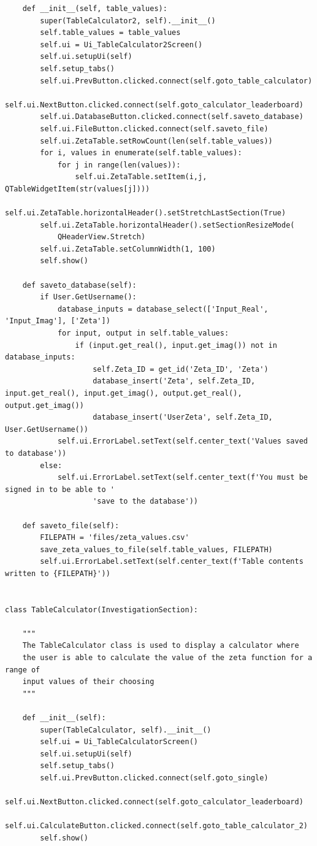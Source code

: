 \documentclass{article}
\begin{document}
\begin{lstlisting}
    def __init__(self, table_values):
        super(TableCalculator2, self).__init__()
        self.table_values = table_values
        self.ui = Ui_TableCalculator2Screen()
        self.ui.setupUi(self)
        self.setup_tabs()
        self.ui.PrevButton.clicked.connect(self.goto_table_calculator)
        self.ui.NextButton.clicked.connect(self.goto_calculator_leaderboard)
        self.ui.DatabaseButton.clicked.connect(self.saveto_database)
        self.ui.FileButton.clicked.connect(self.saveto_file)
        self.ui.ZetaTable.setRowCount(len(self.table_values))
        for i, values in enumerate(self.table_values):
            for j in range(len(values)):
                self.ui.ZetaTable.setItem(i,j, QTableWidgetItem(str(values[j])))
        self.ui.ZetaTable.horizontalHeader().setStretchLastSection(True)
        self.ui.ZetaTable.horizontalHeader().setSectionResizeMode(
            QHeaderView.Stretch)
        self.ui.ZetaTable.setColumnWidth(1, 100)
        self.show()

    def saveto_database(self):
        if User.GetUsername():
            database_inputs = database_select(['Input_Real', 'Input_Imag'], ['Zeta'])
            for input, output in self.table_values:
                if (input.get_real(), input.get_imag()) not in database_inputs:
                    self.Zeta_ID = get_id('Zeta_ID', 'Zeta')
                    database_insert('Zeta', self.Zeta_ID, input.get_real(), input.get_imag(), output.get_real(), output.get_imag())
                    database_insert('UserZeta', self.Zeta_ID, User.GetUsername())
            self.ui.ErrorLabel.setText(self.center_text('Values saved to database'))
        else:
            self.ui.ErrorLabel.setText(self.center_text(f'You must be signed in to be able to '
                    'save to the database'))

    def saveto_file(self):
        FILEPATH = 'files/zeta_values.csv'
        save_zeta_values_to_file(self.table_values, FILEPATH)
        self.ui.ErrorLabel.setText(self.center_text(f'Table contents written to {FILEPATH}'))


class TableCalculator(InvestigationSection):

    """
    The TableCalculator class is used to display a calculator where
    the user is able to calculate the value of the zeta function for a range of
    input values of their choosing
    """

    def __init__(self):
        super(TableCalculator, self).__init__()
        self.ui = Ui_TableCalculatorScreen()
        self.ui.setupUi(self)
        self.setup_tabs()
        self.ui.PrevButton.clicked.connect(self.goto_single)
        self.ui.NextButton.clicked.connect(self.goto_calculator_leaderboard)
        self.ui.CalculateButton.clicked.connect(self.goto_table_calculator_2)
        self.show()


\end{lstlisting}
\end{document}
